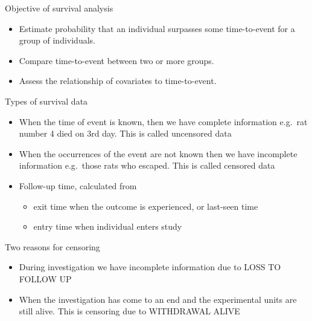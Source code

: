 \documentclass[ignorenonframetext,]{beamer}
\begin{document}
\begin{frame}{Objective of survival analysis}

\begin{itemize}
\itemsep1pt\parskip0pt
\item
  Estimate probability that an individual surpasses some time-to-event
  for a group of individuals.
\item
  Compare time-to-event between two or more groups.
\item
  Assess the relationship of covariates to time-to-event.
\end{itemize}

\end{frame}

\begin{frame}{Types of survival data}

\begin{itemize}
\itemsep1pt\parskip0pt
\item
  When the time of event is known, then we have complete information
  e.g.~rat number 4 died on 3rd day. This is called uncensored data
\item
  When the occurrences of the event are not known then we have
  incomplete information e.g.~those rats who escaped. This is called
  censored data
\item
  Follow-up time, calculated from

  \begin{itemize}
  \itemsep1pt\parskip0pt
  \item
    exit time when the outcome is experienced, or last-seen time
  \item
    entry time when individual enters study
  \end{itemize}
\end{itemize}

\end{frame}

\begin{frame}{Two reasons for censoring}

\begin{itemize}
\itemsep1pt\parskip0pt
\item
  During investigation we have incomplete information due to LOSS TO
  FOLLOW UP
\item
  When the investigation has come to an end and the experimental units
  are still alive. This is censoring due to WITHDRAWAL ALIVE
\end{itemize}

\end{frame}
\end{document}
